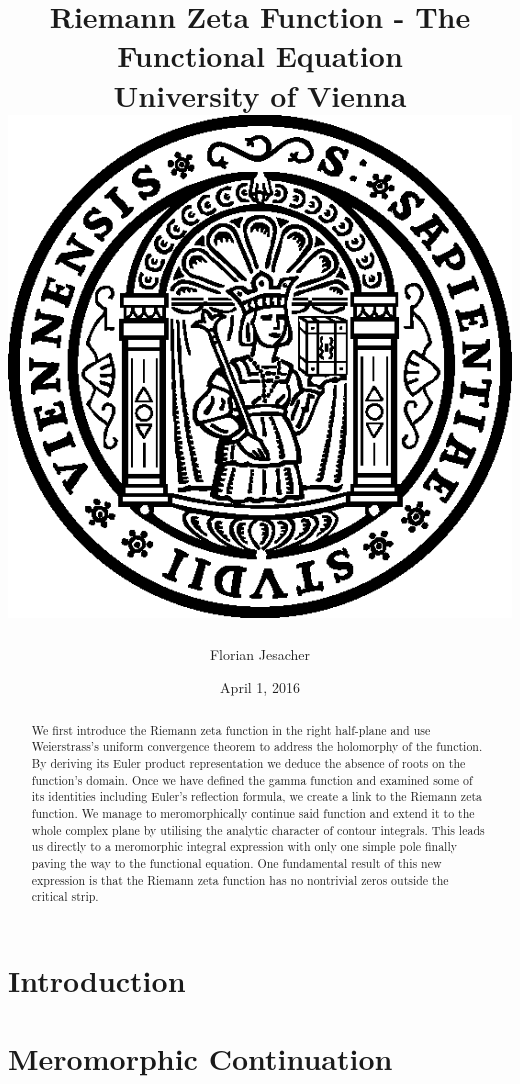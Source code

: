 \documentclass[11pt]{report}
\begin{document}
\title{
	{Riemann Zeta Function - The Functional Equation}\\
	{\large University of Vienna}\\
	{\vspace{3ex}\includegraphics[width=15ex]{University.png}}
}
\author{Florian Jesacher}
\date{April 1, 2016}
\maketitle

\begin{abstract}
We first introduce the Riemann zeta function in the right half-plane and use Weierstrass's uniform convergence theorem to address the holomorphy of the function. By deriving its Euler product representation we deduce the absence of roots on the function's domain. Once we have defined the gamma function and examined some of its identities including Euler's reflection formula, we create a link to the Riemann zeta function. We manage to meromorphically continue said function and extend it to the whole complex plane by utilising the analytic character of contour integrals. This leads us directly to a meromorphic integral expression with only one simple pole finally paving the way to the functional equation. One fundamental result of this new expression is that the Riemann zeta function has no nontrivial zeros outside the critical strip.
\end{abstract}

\tableofcontents

\chapter{Introduction}


\chapter{Meromorphic Continuation}


\appendix


\nocite{*}
\end{document}
